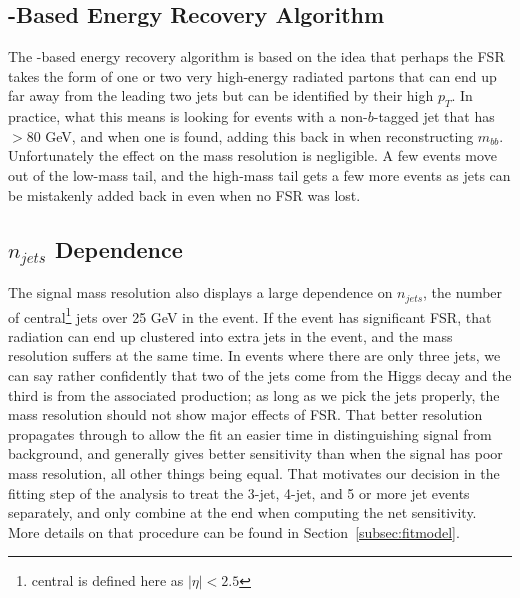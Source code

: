 \subsection{\pt-Based Energy Recovery Algorithm}
The \pt-based energy recovery algorithm is based on the idea that perhaps the FSR takes the form of one
or two very high-energy radiated partons that can end up far away from the leading two jets but can be
identified by their high $p_T$. In practice, what this means is looking for events with a non-$b$-tagged jet that
has \pt$>$80 GeV, and when one is found, adding this back in when reconstructing $m_{bb}$.
Unfortunately the effect on the mass resolution is negligible. A few events move out of the low-mass
tail, and the high-mass tail gets a few more events as jets can be mistakenly added back in even when no
FSR was lost.






\subsection{$n_{jets}$ Dependence}
\label{sec:n_jets_sig}

The signal mass resolution also displays a large dependence on $n_{jets}$, the 
number of central\footnote{central is defined here as $|\eta|<2.5$} 
jets over 25 GeV in the event.  If the event has significant FSR,
that radiation can end up clustered into extra jets in the event, and the 
mass resolution suffers at the same time.  In events where there are only three jets,
we can say rather confidently that two of the jets come from the Higgs decay
and the third is from the associated production; as long as we pick the jets
properly, the mass resolution should not show major effects of FSR.  That 
better resolution propagates through to allow the fit an easier time in distinguishing
signal from background, and generally gives better sensitivity than 
when the signal has poor mass resolution, all other things being equal.  
That motivates our decision in the fitting step of the analysis to treat
the 3-jet, 4-jet, and 5 or more jet events separately, and only combine at the
end when computing the net sensitivity.  More details on that procedure can 
be found in Section~\ref{subsec:fitmodel}.



